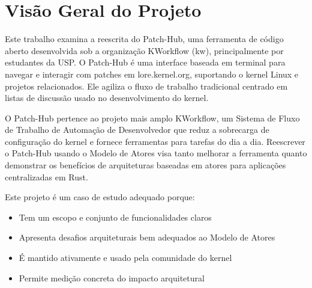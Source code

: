 \section{Visão Geral do Projeto}

Este trabalho examina a reescrita do Patch-Hub, uma ferramenta de código aberto desenvolvida sob a organização KWorkflow (kw), principalmente por estudantes da USP. O Patch-Hub é uma interface baseada em terminal para navegar e interagir com patches em lore.kernel.org, suportando o kernel Linux e projetos relacionados. Ele agiliza o fluxo de trabalho tradicional centrado em listas de discussão usado no desenvolvimento do kernel.

O Patch-Hub pertence ao projeto mais amplo KWorkflow, um Sistema de Fluxo de Trabalho de Automação de Desenvolvedor que reduz a sobrecarga de configuração do kernel e fornece ferramentas para tarefas do dia a dia. Reescrever o Patch-Hub usando o Modelo de Atores visa tanto melhorar a ferramenta quanto demonstrar os benefícios de arquiteturas baseadas em atores para aplicações centralizadas em Rust.

Este projeto é um caso de estudo adequado porque:

\begin{itemize}
    \item Tem um escopo e conjunto de funcionalidades claros
    \item Apresenta desafios arquiteturais bem adequados ao Modelo de Atores
    \item É mantido ativamente e usado pela comunidade do kernel
    \item Permite medição concreta do impacto arquitetural
\end{itemize}
